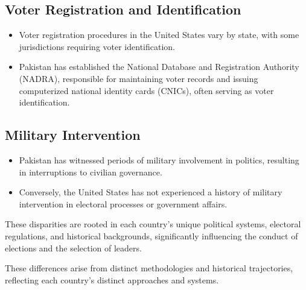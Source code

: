 \documentclass{article}
\begin{document}
\subsection{Voter Registration and Identification}
\begin{itemize}
    \item Voter registration procedures in the United States vary by state, with some jurisdictions requiring voter identification.
    \item Pakistan has established the National Database and Registration Authority (NADRA), responsible for maintaining voter records and issuing computerized national identity cards (CNICs), often serving as voter identification.
\end{itemize}

\subsection{Military Intervention}
\begin{itemize}
    \item Pakistan has witnessed periods of military involvement in politics, resulting in interruptions to civilian governance.
    \item Conversely, the United States has not experienced a history of military intervention in electoral processes or government affairs.
\end{itemize}

These disparities are rooted in each country's unique political systems, electoral regulations, and historical backgrounds, significantly influencing the conduct of elections and the selection of leaders.

These differences arise from distinct methodologies and historical trajectories, reflecting each country's distinct approaches and systems.
\end{document}
